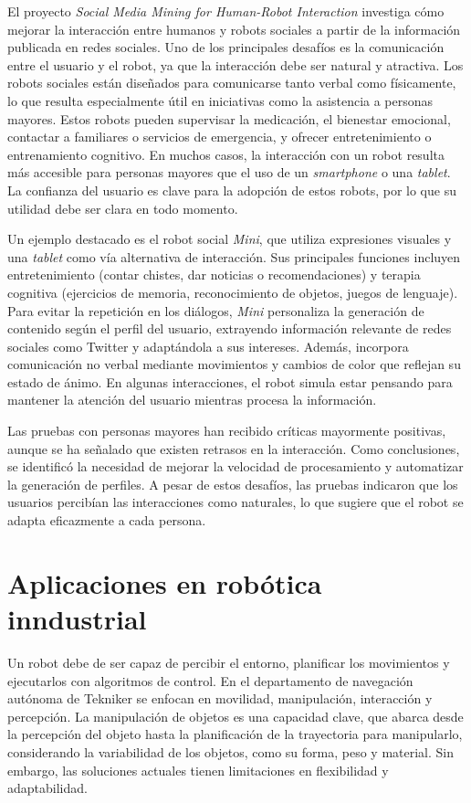 El proyecto \textit{Social Media Mining for Human-Robot Interaction} investiga cómo mejorar la interacción entre humanos y robots sociales a partir de la información publicada en redes sociales. Uno de los principales desafíos es la comunicación entre el usuario y el robot, ya que la interacción debe ser natural y atractiva. Los robots sociales están diseñados para comunicarse tanto verbal como físicamente, lo que resulta especialmente útil en iniciativas como la asistencia a personas mayores. Estos robots pueden supervisar la medicación, el bienestar emocional, contactar a familiares o servicios de emergencia, y ofrecer entretenimiento o entrenamiento cognitivo. En muchos casos, la interacción con un robot resulta más accesible para personas mayores que el uso de un \textit{smartphone} o una \textit{tablet}. La confianza del usuario es clave para la adopción de estos robots, por lo que su utilidad debe ser clara en todo momento.

Un ejemplo destacado es el robot social \textit{Mini}, que utiliza expresiones visuales y una \textit{tablet} como vía alternativa de interacción. Sus principales funciones incluyen entretenimiento (contar chistes, dar noticias o recomendaciones) y terapia cognitiva (ejercicios de memoria, reconocimiento de objetos, juegos de lenguaje). Para evitar la repetición en los diálogos, \textit{Mini} personaliza la generación de contenido según el perfil del usuario, extrayendo información relevante de redes sociales como Twitter y adaptándola a sus intereses. Además, incorpora comunicación no verbal mediante movimientos y cambios de color que reflejan su estado de ánimo. En algunas interacciones, el robot simula estar pensando para mantener la atención del usuario mientras procesa la información.

Las pruebas con personas mayores han recibido críticas mayormente positivas, aunque se ha señalado que existen retrasos en la interacción. Como conclusiones, se identificó la necesidad de mejorar la velocidad de procesamiento y automatizar la generación de perfiles. A pesar de estos desafíos, las pruebas indicaron que los usuarios percibían las interacciones como naturales, lo que sugiere que el robot se adapta eficazmente a cada persona.
\newpage

\section{Aplicaciones en robótica inndustrial}
Un robot debe de ser capaz de percibir el entorno, planificar los movimientos y ejecutarlos con algoritmos de control. En el departamento de navegación autónoma de Tekniker se enfocan en movilidad, manipulación, interacción y percepción. La manipulación de objetos es una capacidad clave, que abarca desde la percepción del objeto hasta la planificación de la trayectoria para manipularlo, considerando la variabilidad de los objetos, como su forma, peso y material. Sin embargo, las soluciones actuales tienen limitaciones en flexibilidad y adaptabilidad. 

